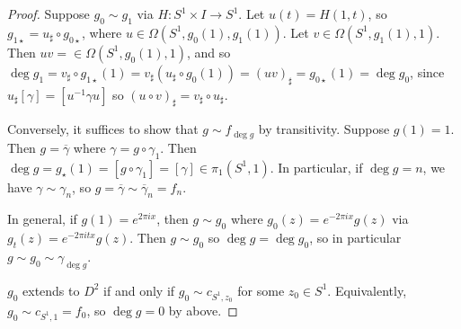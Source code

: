 \begin{proof}
	Suppose \( g_0 \sim g_1 \) via \( H \colon S^1 \times I \to S^1 \).
	Let \( u(t) = H(1,t) \), so \( g_{1\star} = u_\sharp \circ g_{0\star} \), where \( u \in \Omega(S^1,g_0(1),g_1(1)) \).
	Let \( v \in \Omega(S^1,g_1(1),1) \).
	Then \( uv = \in \Omega(S^1,g_0(1),1) \), and so \( \deg g_1 = v_\sharp \circ g_{1\star}(1) = v_\sharp(u_\sharp\circ g_0(1)) = (uv)_\sharp = g_{0\star}(1) = \deg g_0 \), since \( u_\sharp[\gamma] = [u^{-1}\gamma u] \) so \( (u \circ v)_\sharp = v_\sharp \circ u_\sharp \).

	Conversely, it suffices to show that \( g \sim f_{\deg g} \) by transitivity.
	Suppose \( g(1) = 1 \).
	Then \( g = \overline \gamma \) where \( \gamma = g \circ \gamma_1 \).
	Then \( \deg g = g_\star(1) = [g \circ \gamma_1] = [\gamma] \in \pi_1(S^1,1) \).
	In particular, if \( \deg g = n \), we have \( \gamma \sim \gamma_n \), so \( g = \overline \gamma \sim \overline \gamma_n = f_n \).

	In general, if \( g(1) = e^{2\pi i x} \), then \( g \sim g_0 \) where \( g_0(z) = e^{-2\pi i x}g(z) \) via \( g_t(z) = e^{-2\pi i t x}g(z) \).
	Then \( g \sim g_0 \) so \( \deg g = \deg g_0 \), so in particular \( g \sim g_0 \sim \gamma_{\deg g} \).

	\( g_0 \) extends to \( D^2 \) if and only if \( g_0 \sim c_{S^1,z_0} \) for some \( z_0 \in S^1 \).
	Equivalently, \( g_0 \sim c_{S^1,1} = f_0 \), so \( \deg g = 0 \) by above.
\end{proof}

